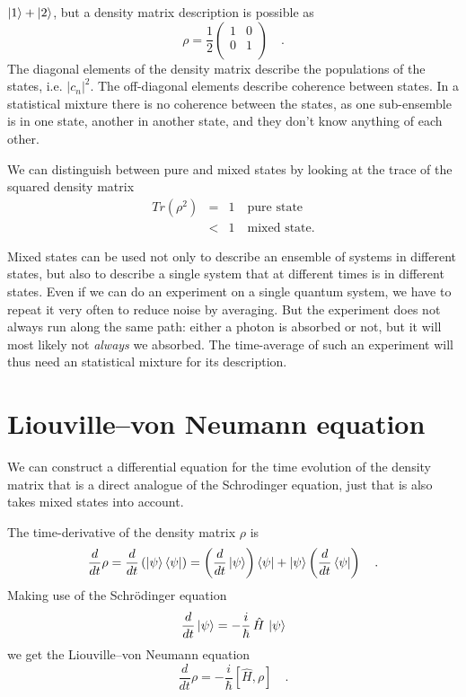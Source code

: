 $\ket{1} + \ket{2} $, but a density matrix description is possible as
\begin{equation}
 \rho = \frac{1}{2} \begin{pmatrix}
 1 & 0 \\ 0 & 1 \\
 \end{pmatrix} \quad .
\end{equation}
The diagonal elements of the density matrix describe the populations of the states, i.e. $|c_n|^2$. The off-diagonal elements describe coherence between states. In a statistical mixture there is no coherence between the states, as one sub-ensemble is in one state, another in another state, and they don't know anything of each other.

We can distinguish between pure and mixed states by looking at the trace of the squared density matrix
\begin{eqnarray}
 Tr (\rho^2) & = & 1 \quad \text{pure state} \\
 				& < & 1 \quad \text{mixed state.}
\end{eqnarray}

Mixed states can be  used not only to describe an ensemble of systems in different states, but also to describe a single system that at different times is in different states. Even if we can do an experiment on  a single quantum system, we have to repeat it very often to reduce noise by averaging. But the experiment does not always run along the same path: either a photon is absorbed or not, but it will most likely not \emph{always}  we absorbed. The time-average of such an experiment will thus need  an statistical mixture for its description.

\section{Liouville--von Neumann equation}

We can construct a differential equation for the time evolution of the density matrix that is a direct analogue of the Schrodinger equation, just that is also takes mixed states into account.

The time-derivative of the density matrix $\rho$ is
\begin{equation}
 \frac{d}{dt} \rho = \frac{d}{dt} \left( \ket{\psi} \bra{\psi} \right) 
 =  \left( \frac{d}{dt}  \ket{\psi} \right) \bra{\psi} 
 + \ket{\psi} \left( \frac{d}{dt}  \bra{\psi} \right)  \quad .
\end{equation}
Making use of the Schrödinger equation
\begin{equation}
 \frac{d}{dt} \ket{\psi} = - \frac{i}{\hbar} \, \hat{H} \, \ket{\psi}
\end{equation}
we get the Liouville--von Neumann equation
\begin{equation}
 \frac{d}{dt} \rho = - \frac{i}{\hbar} 
 \left[ \hat{H} , \rho \right]  \quad .
\end{equation}

